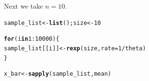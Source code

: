 \documentclass[11pt, a4paper]{article}\usepackage[]{graphicx}\usepackage[]{xcolor}
\makeatletter
\newcommand{\hlnum}[1]{\textcolor[rgb]{0.686,0.059,0.569}{#1}}%
\newcommand{\hlopt}[1]{\textcolor[rgb]{0,0,0}{#1}}%
\newcommand{\hldef}[1]{\textcolor[rgb]{0.345,0.345,0.345}{#1}}%
\newcommand{\hlkwa}[1]{\textcolor[rgb]{0.161,0.373,0.58}{\textbf{#1}}}%
\newcommand{\hlkwb}[1]{\textcolor[rgb]{0.69,0.353,0.396}{#1}}%
\newcommand{\hlkwc}[1]{\textcolor[rgb]{0.333,0.667,0.333}{#1}}%
\newcommand{\hlkwd}[1]{\textcolor[rgb]{0.737,0.353,0.396}{\textbf{#1}}}%
\newenvironment{kframe}{%
 \def\at@end@of@kframe{}%
 \ifinner\ifhmode%
  \def\at@end@of@kframe{\end{minipage}}%
  \begin{minipage}{\columnwidth}%
 \fi\fi%
 \def\FrameCommand##1{\hskip\@totalleftmargin \hskip-\fboxsep
 \colorbox{shadecolor}{##1}\hskip-\fboxsep
     \hskip-\linewidth \hskip-\@totalleftmargin \hskip\columnwidth}%
 \MakeFramed {\advance\hsize-\width
   \@totalleftmargin\z@ \linewidth\hsize
   \@setminipage}}%
 {\par\unskip\endMakeFramed%
 \at@end@of@kframe}
\newenvironment{knitrout}{}{} %
\makeatother
\begin{document}
\newpage

Next we take $n = 10$.

\begin{knitrout}
\color{fgcolor}\begin{kframe}
\begin{alltt}
\hldef{sample_list} \hlkwb{<-} \hlkwd{list}\hldef{(); size} \hlkwb{<-} \hlnum{10}

\hlkwa{for}\hldef{(i} \hlkwa{in} \hlnum{1}\hlopt{:}\hlnum{10000}\hldef{)\{}
  \hldef{sample_list[[i]]} \hlkwb{<-} \hlkwd{rexp}\hldef{(size,} \hlkwc{rate} \hldef{=} \hlnum{1} \hlopt{/} \hldef{theta)}
\hldef{\}}

\hldef{x_bar} \hlkwb{<-} \hlkwd{sapply}\hldef{(sample_list, mean)}
\end{alltt}
\end{kframe}
\end{knitrout}
\end{document}
